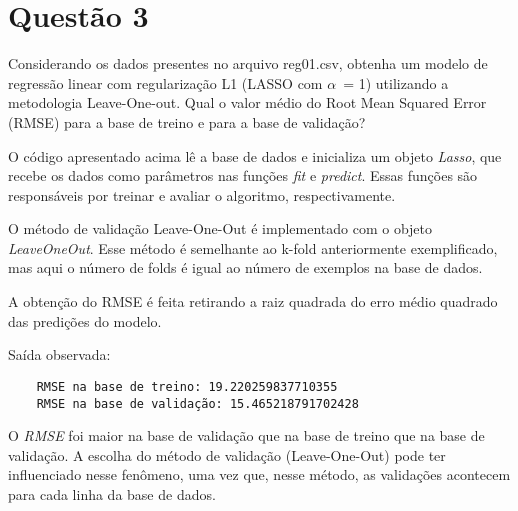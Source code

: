\section{Questão 3}

Considerando os dados presentes no arquivo reg01.csv, obtenha um modelo de regressão linear com regularização L1 (LASSO com $\alpha$\ = 1) utilizando a metodologia Leave-One-out. Qual o valor médio do Root Mean Squared Error (RMSE) para a base de treino e para a base de validação?



O código apresentado acima lê a base de dados e inicializa um objeto \emph{Lasso}, que recebe os dados como parâmetros nas funções \emph{fit} e \emph{predict}. Essas funções são responsáveis por treinar e avaliar o algoritmo, respectivamente.

O método de validação Leave-One-Out é implementado com o objeto \emph{LeaveOneOut}. Esse método é semelhante ao k-fold anteriormente exemplificado, mas aqui o número de folds é igual ao número de exemplos na base de dados.

A obtenção do RMSE é feita retirando a raiz quadrada do erro médio quadrado das predições do modelo.

Saída observada:

\begin{lstlisting}
    RMSE na base de treino: 19.220259837710355
    RMSE na base de validação: 15.465218791702428
\end{lstlisting}

O \emph{RMSE} foi maior na base de validação que na base de treino que na base de validação. A escolha do método de validação (Leave-One-Out) pode ter influenciado nesse fenômeno, uma vez que, nesse método, as validações acontecem para cada linha da base de dados.